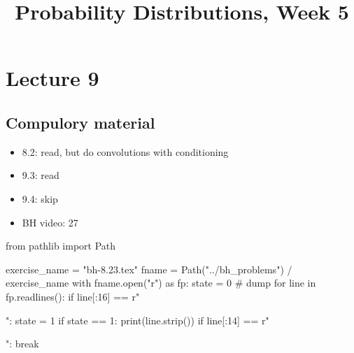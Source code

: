 


\title{Probability Distributions, Week 5}


\maketitle
\toccontents

\section{Lecture 9}
\label{sec:lecture-1}

\subsection{Compulory material}
\label{sec:compulory-material}


\begin{itemize}
\item 8.2: read, but do convolutions with conditioning
\item 9.3: read
\item 9.4: skip
\item BH video: 27
\end{itemize}


\begin{pycode}
from pathlib import Path

exercise_name = "bh-8.23.tex"
fname = Path("../bh_problems") / exercise_name
with fname.open("r") as fp:
    state = 0  # dump
    for line in fp.readlines():
        if line[:16] == r"\begin{exercise}":
            state = 1
        if state == 1:
            print(line.strip())
        if line[:14] == r"\end{exercise}":
            break
\end{pycode}


